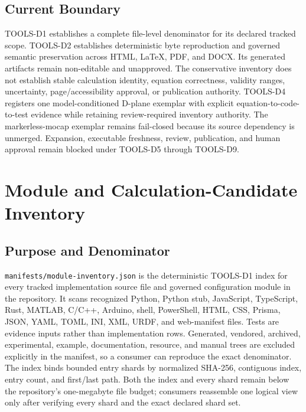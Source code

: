 \documentclass[
  american,
]{article}
\begin{document}
\subsection{Current Boundary}\label{current-boundary}

TOOLS-D1 establishes a complete file-level denominator for its declared
tracked scope. TOOLS-D2 establishes deterministic byte reproduction and
governed semantic preservation across HTML, LaTeX, PDF, and DOCX. Its
generated artifacts remain non-editable and unapproved. The conservative
inventory does not establish stable calculation identity, equation
correctness, validity ranges, uncertainty, page/accessibility approval,
or publication authority. TOOLS-D4 registers one model-conditioned
D-plane exemplar with explicit equation-to-code-to-test evidence while
retaining review-required inventory authority. The markerless-mocap
exemplar remains fail-closed because its source dependency is unmerged.
Expansion, executable freshness, review, publication, and human approval
remain blocked under TOOLS-D5 through TOOLS-D9.

\section{Module and Calculation-Candidate
Inventory}\label{module-and-calculation-candidate-inventory}

\subsection{Purpose and Denominator}\label{purpose-and-denominator}

\texttt{manifests/module-inventory.json} is the deterministic TOOLS-D1
index for every tracked implementation source file and governed
configuration module in the repository. It scans recognized Python,
Python stub, JavaScript, TypeScript, Rust, MATLAB, C/C++, Arduino,
shell, PowerShell, HTML, CSS, Prisma, JSON, YAML, TOML, INI, XML, URDF,
and web-manifest files. Tests are evidence inputs rather than
implementation rows. Generated, vendored, archived, experimental,
example, documentation, resource, and manual trees are excluded
explicitly in the manifest, so a consumer can reproduce the exact
denominator. The index binds bounded entry shards by normalized SHA-256,
contiguous index, entry count, and first/last path. Both the index and
every shard remain below the repository's one-megabyte file budget;
consumers reassemble one logical view only after verifying every shard
and the exact declared shard set.
\end{document}
